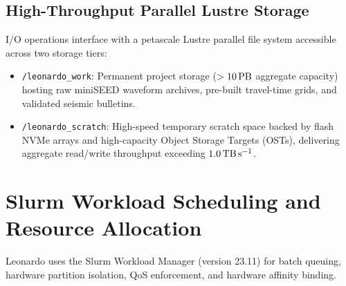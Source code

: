 \subsection{High-Throughput Parallel Lustre Storage}
I/O operations interface with a petascale Lustre parallel file
system accessible across two storage tiers:
\begin{itemize}
  \item \texttt{/leonardo\_work}: Permanent project storage ($>
    \qty{10}{\peta\byte}$ aggregate capacity) hosting raw miniSEED
    waveform archives, pre-built travel-time grids, and validated
    seismic bulletins.
  \item \texttt{/leonardo\_scratch}: High-speed temporary scratch
    space backed by flash NVMe arrays and high-capacity Object
    Storage Targets (OSTs), delivering aggregate read/write
    throughput exceeding $\qty{1.0}{\tera\byte\per\second}$.
\end{itemize}

\section{Slurm Workload Scheduling and Resource Allocation}
\label{sec:slurm_scheduling}

Leonardo uses the Slurm Workload Manager (version 23.11) for batch
queuing, hardware partition isolation, \ac{QoS} enforcement, and
hardware affinity binding.

